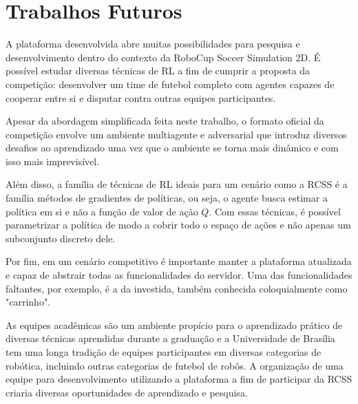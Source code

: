 \section{Trabalhos Futuros}

A plataforma desenvolvida abre muitas possibilidades para pesquisa e desenvolvimento dentro do contexto da RoboCup Soccer Simulation 2D. É possível estudar diversas técnicas de RL a fim de cumprir a proposta da competição: desenvolver um time de futebol completo com agentes capazes de cooperar entre si e disputar contra outras equipes participantes.

Apesar da abordagem simplificada feita neste trabalho, o formato oficial da competição envolve um ambiente multiagente e adversarial que introduz diversos desafios ao aprendizado uma vez que o ambiente se torna mais dinâmico e com isso mais imprevisível.

Além disso, a família de técnicas de RL ideais para um cenário como a RCSS é a família métodos de gradientes de políticas, ou seja, o agente busca estimar a política em si e não a função de valor de ação $Q$. Com essas técnicas, é possível parametrizar a política de modo a cobrir todo o espaço de ações e não apenas um subconjunto discreto dele.

Por fim, em um cenário competitivo é importante manter a plataforma atualizada e capaz de abstrair todas as funcionalidades do servidor. Uma das funcionalidades faltantes, por exemplo, é a da investida, também conhecida coloquialmente como "carrinho".

As equipes acadêmicas são um ambiente propício para o aprendizado prático de diversas técnicas aprendidas durante a graduação e a Universidade de Brasília tem uma longa tradição de equipes participantes em diversas categorias de robótica, incluindo outras categorias de futebol de robôs. A organização de uma equipe para desenvolvimento utilizando a plataforma a fim de participar da RCSS criaria diversas oportunidades de aprendizado e pesquisa.

